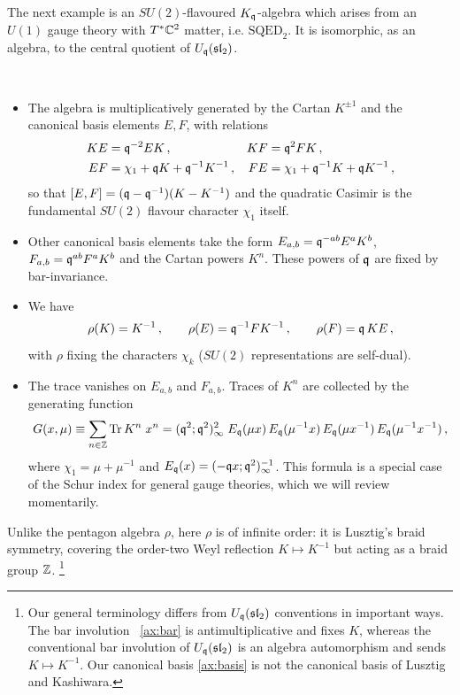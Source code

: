 \documentclass[12pt]{amsart}
\begin{document}
The next example is an $SU(2)$-flavoured $K_{\mathfrak{q}}$-algebra which arises from
an $U(1)$ gauge theory with $T^* \mathbb{C}^2$ matter, i.e. $\mathrm{SQED}_2$. 
It is isomorphic, as an algebra, to the central quotient of
$U_{\mathfrak{q}}(\mathfrak{sl}_2)$. 
\begin{definition} \,
\begin{itemize}
	\item The algebra is multiplicatively generated by the Cartan $K^{\pm 1}$ and the
	canonical basis elements $E,F$, with relations
	\begin{align}
		K E &= \mathfrak{q}^{-2} E K \,,                    & K F &= \mathfrak{q}^{2} F K \,, \\
		E F &= \chi_1 + \mathfrak{q} K + \mathfrak{q}^{-1} K^{-1}\,, & F E &= \chi_1 + \mathfrak{q}^{-1} K + \mathfrak{q} K^{-1} \,,
	\end{align}
	so that $[E,F] = (\mathfrak{q}-\mathfrak{q}^{-1})(K-K^{-1})$ and the quadratic Casimir is the fundamental $SU(2)$
	flavour character $\chi_1$ itself. 
	\item Other canonical basis elements take the form $E_{a,b} = \mathfrak{q}^{-ab} E^a K^b$, $F_{a,b}=\mathfrak{q}^{ab} F^a K^b$ and the Cartan powers $K^n$. These powers of $\mathfrak{q}$ are fixed by bar-invariance.
	\item We have 
	\begin{equation}
		\rho(K)=K^{-1} \,, \qquad \rho(E)=\mathfrak{q}^{-1}FK^{-1} \,, \qquad \rho(F)=\mathfrak{q}\,KE \,,
	\end{equation}
	with $\rho$ fixing the characters $\chi_k$ ($SU(2)$ representations are self-dual). 
	\item The trace vanishes on $E_{a,b}$ and $F_{a,b}$.  Traces of $K^n$ are collected by the
	generating function
	\begin{equation}\label{eq:uqsl2trace}
		G(x,\mu) \equiv \sum_{n\in\mathbb{Z}} \operatorname{Tr} K^n \; x^n = (\mathfrak{q}^2;\mathfrak{q}^2)_\infty^2 \;
		E_{\mathfrak{q}}(\mu x)\,E_{\mathfrak{q}}(\mu^{-1} x)\,E_{\mathfrak{q}}(\mu x^{-1})\,E_{\mathfrak{q}}(\mu^{-1} x^{-1}) \, ,
	\end{equation}
	where $\chi_1 = \mu+ \mu^{-1}$ and $E_{\mathfrak{q}}(x) = (-\mathfrak{q} x;\mathfrak{q}^2)_\infty^{-1}$. This formula is a special case of the Schur index for general gauge theories, which we will review momentarily. 
\end{itemize}
\end{definition}
Unlike the pentagon algebra $\rho$, here $\rho$ is of infinite order: it is Lusztig's braid symmetry,
covering the order-two Weyl reflection $K\mapsto K^{-1}$ but acting as a braid
group $\mathbb{Z}$. \footnote{Our general terminology differs from $U_{\mathfrak{q}}(\mathfrak{sl}_2)$ conventions in important ways. The bar involution ~\ref{ax:bar} is antimultiplicative and fixes $K$, whereas the conventional bar involution of $U_{\mathfrak{q}}(\mathfrak{sl}_2)$ is an algebra automorphism and sends $K \mapsto K^{-1}$. Our canonical basis \ref{ax:basis} is not the canonical basis of Lusztig and Kashiwara.}
	
\end{document}
